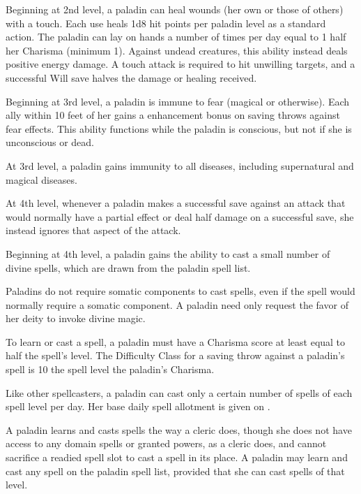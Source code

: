  Beginning at 2nd level, a paladin can heal wounds (her own or those of others) with a touch. Each use heals 1d8 hit points per paladin level as a standard action. The paladin can lay on hands a number of times per day equal to 1 \add half her Charisma (minimum 1). Against undead creatures, this ability instead deals positive energy damage. A touch attack is required to hit unwilling targets, and a successful Will save halves the damage or healing received.

  Beginning at 3rd level, a paladin is immune to fear (magical or otherwise). Each ally within 10 feet of her gains a  enhancement bonus on saving throws against fear effects. This ability functions while the paladin is conscious, but not if she is unconscious or dead.

 At 3rd level, a paladin gains immunity to all diseases, including supernatural and magical diseases.

 At 4th level, whenever a paladin makes a successful save against an attack that would normally have a partial effect or deal half damage on a successful save, she instead ignores that aspect of the attack.

 Beginning at 4th level, a paladin gains the ability to cast a small number of divine spells, which are drawn from the paladin spell list.

Paladins do not require somatic components to cast spells, even if the spell would normally require a somatic component. A paladin need only request the favor of her deity to invoke divine magic.

\par To learn or cast a spell, a paladin must have a Charisma score at least equal to half the spell's level. The Difficulty Class for a saving throw against a paladin's spell is 10 \add the spell level \add the paladin's Charisma.

\par Like other spellcasters, a paladin can cast only a certain number of spells of each spell level per day. Her base daily spell allotment is given on .

A paladin learns and casts spells the way a cleric does, though she does not have access to any domain spells or granted powers, as a cleric does, and cannot sacrifice a readied spell slot to cast a  spell in its place. A paladin may learn and cast any spell on the paladin spell list, provided that she can cast spells of that level.

